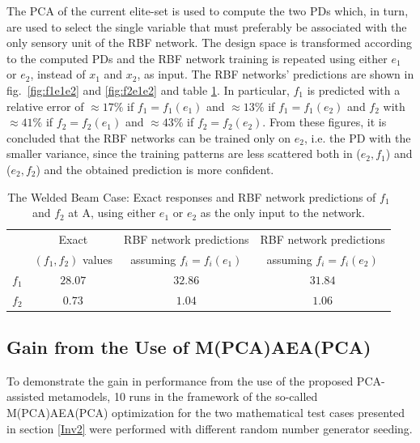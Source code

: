 The PCA of the current elite-set is used to compute the two PDs which, in turn, are used to select the single variable that must preferably be associated with the only sensory unit of the RBF network. The design space is transformed according to the computed PDs and the RBF network training is repeated using either $e_1$ or $e_2$, instead of $x_1$ and $x_2$, as input. 
The RBF networks' predictions are shown in fig.\ \ref{fig:f1e1e2} and \ref{fig:f2e1e2} and table \ref{tab:f1f2e1e2}. 
In particular, $f_1$ is predicted with a relative error of $\approx \! 17\%$ if $f_1\!=\!f_1(e_1)$ and $\approx \! 13\%$ if $f_1\!=\!f_1(e_2)$ and $f_2$ with $\approx \! 41\%$ if $f_2\!=\!f_2(e_1)$ and $\approx \! 43\%$ if $f_2\!=\!f_2(e_2)$. From these figures, it is concluded that the RBF networks can be trained only on $e_2$, i.e. the PD with the smaller variance, since the training patterns are less scattered both in ($e_2,f_1$) and ($e_2,f_2$) and the obtained prediction is more confident.




\begin{table}[h!]
\begin{center}
\begin{tabular}{c  c | c | c}
		&      Exact  	 		&  RBF network predictions    &  RBF network  predictions   \\
		&  $(f_1,f_2)$ values   &  assuming $f_i=f_i(e_1)$    &   assuming $f_i=f_i(e_2)$  \\
		\hline
$f_1$	& $28.07$   &      $32.86$     &      $31.84$        \\
$f_2$	& $0.73$     &      $ 1.04$     &       $ 1.06$        \\
\end{tabular}
\end{center}
\caption{The Welded Beam Case: Exact responses and RBF network predictions of $f_1$ and $f_2$ at A, using either $e_1$ or $e_2$ as the only input to the network.}
\label{tab:f1f2e1e2}
\end{table}


\subsection{Gain from the Use of M(PCA)AEA(PCA)}

To demonstrate the gain in performance from the use of the proposed PCA-assisted metamodels, 10 runs in the framework of the so-called M(PCA)AEA(PCA) optimization for the two mathematical test cases presented in section \ref{Inv2} were performed with different random number generator seeding.  

